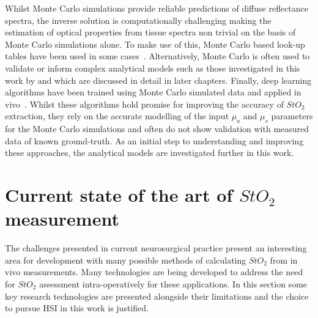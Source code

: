 Whilst Monte Carlo simulations provide reliable predictions of diffuse reflectance spectra, the inverse solution is computationally challenging making the estimation of optical properties from tissue spectra non trivial on the basis of Monte Carlo simulations alone. To make use of this, Monte Carlo based look-up tables have been used in some cases~\cite{Nguyen2021, Yang2022}. Alternatively, Monte Carlo is often used to validate or inform complex analytical models such as those investigated in this work by \citet{Jacques1999} and \citet{Yudovsky2009} which are discussed in detail in later chapters. Finally, deep learning algorithms have been trained using Monte Carlo simulated data and applied in vivo~\cite{Wirkert2017, Wirkert2016}. Whilst these algorithms hold promise for improving the accuracy of $StO_2$ extraction, they rely on the accurate modelling of the input $\mu_a$ and $\mu_s$ parameters for the Monte Carlo simulations and often do not show validation with measured data of known ground-truth. As an initial step to understanding and improving these approaches, the analytical models are investigated further in this work.

\section{Current state of the art of $StO_2$ measurement}\label{sec:stateofart}
The challenges presented in current neurosurgical practice present an interesting area for development with many possible methods of calculating $StO_2$ from in vivo measurements. Many technologies are being developed to address the need for $StO_2$ assessment intra-operatively for these applications. In this section some key research technologies are presented alongside their limitations and the choice to pursue HSI in this work is justified. 

